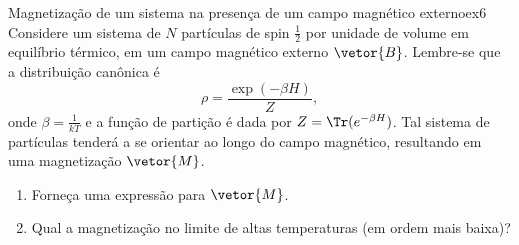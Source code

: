 \begin{exercício}{Magnetização de um sistema na presença de um campo magnético externo}{ex6}
   Considere um sistema de \(N\) partículas de spin \(\frac12\) por unidade de volume em equilíbrio térmico, em um campo magnético externo \(\vetor{B}\). Lembre-se que a distribuição canônica é
   \begin{equation*}
      \rho = \frac{\exp(- \beta H)}{Z},
   \end{equation*}
   onde \(\beta = \frac{1}{k T}\) e a função de partição é dada por \(Z = \Tr(e^{-\beta H})\). Tal sistema de partículas tenderá a se orientar ao longo do campo magnético, resultando em uma magnetização \(\vetor{M}\).
   \begin{enumerate}[label=(\alph*)]
      \item Forneça uma expressão para \(\vetor{M}\).
      \item Qual a magnetização no limite de altas temperaturas (em ordem mais baixa)?
   \end{enumerate}
\end{exercício}

